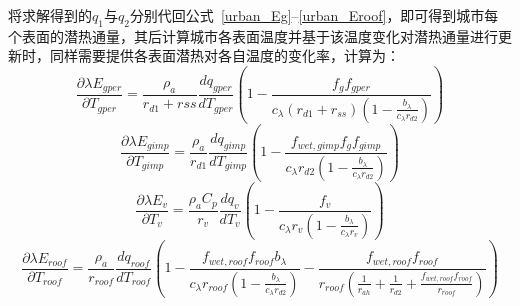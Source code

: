 将求解得到的$q_{1}$与$q_{2}$分别代回公式~\eqref{urban_Eg}--\eqref{urban_Eroof}，即可得到城市每个表面的潜热通量，其后计算城市各表面温度并基于该温度变化对潜热通量进行更新时，同样需要提供各表面潜热对各自温度的变化率，计算为：
\begin{equation}
\frac{\partial \lambda E_{gper}}{\partial T_{gper}} = \frac{\rho _a}{r_{d1}+rss} \frac{dq_{gper}}{dT_{gper}} \left(1-\frac{f_{g}f_{gper}}{c_{\lambda} \left(r_{d1}+r_{ss}\right) \left(1-\frac{b_{\lambda}}{c_{\lambda} r_{d2}}\right)}\right)
\end{equation}
%
\begin{equation}
\frac{\partial \lambda E_{gimp}}{\partial T_{gimp}} = \frac{\rho _a}{r_{d1}} \frac{dq_{gimp}}{dT_{gimp}} \left(1-\frac{f_{wet,gimp} f_{g} f_{gimp}}{c_{\lambda} r_{d2}\left(1-\frac{b_{\lambda}}{c_{\lambda} r_{d2}}\right)}\right)
\end{equation}
%
\begin{equation}
\frac{\partial \lambda E_{v}}{\partial T_{v}} = \frac{\rho _a C_p}{r_{v}} \frac{dq_{v}}{dT_{v}} \left(1-\frac{f_{v}}{c_{\lambda} r_{v}\left(1-\frac{b_{\lambda}}{c_{\lambda} r_{v}}\right)}\right)
\end{equation}
%
\begin{equation}
\frac{\partial \lambda E_{roof}}{\partial T_{roof}} = \frac{\rho _a}{r_{roof}} \frac{dq_{roof}}{dT_{roof}} \left(1-\frac{f_{wet,roof}f_{roof} b_{\lambda}}{c_{\lambda} r_{roof} \left(1-\frac{b_{\lambda}}{c_{\lambda} r_{d2}}\right)}-\frac{f_{wet,roof}f_{roof}}{r_{roof}\left(\frac{1}{r_{ah}}+\frac{1}{r_{d2}}+\frac{f_{wet,roof} f_{roof}}{r_{roof}}\right)}\right)
\end{equation}